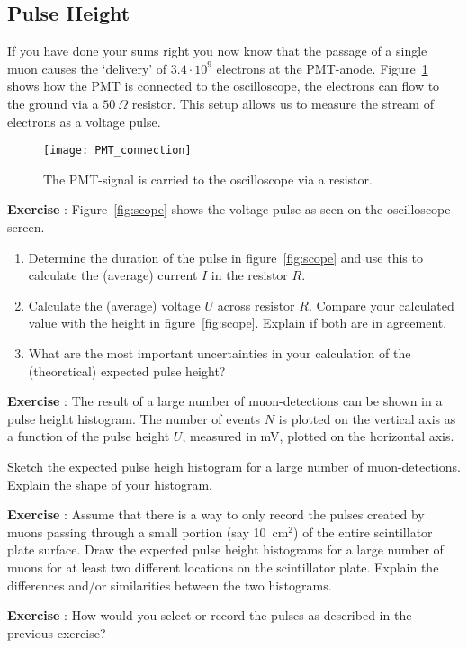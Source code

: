 \subsection{Pulse Height}
If you have done your sums right you now know that the passage of a single muon causes the `delivery' of $3.4 \cdot 10^9$ electrons at the PMT-anode. Figure~\ref{fig:PMT_connection} shows how the PMT is connected to the oscilloscope, the electrons can flow to the ground via a $50~\Omega$ resistor. This setup allows us to measure the stream of electrons as a voltage pulse.

\begin{figure}\begin{center}
\texttt{[image: PMT\_connection]}%
\caption{The PMT-signal is carried to the oscilloscope via a resistor. }\label{fig:PMT_connection}
\end{center}\end{figure}

\begin{shaded}
\textbf{Exercise \theExercise {}} : Figure~\ref{fig:scope} shows the voltage pulse as seen on the oscilloscope screen.
\begin{enumerate}[-]
\item Determine the duration of the pulse in figure~\ref{fig:scope} and use this to calculate the (average) current $I$ in the resistor $R$.
\item Calculate the (average) voltage $U$ across resistor $R$. Compare your calculated value with the height in figure~\ref{fig:scope}. Explain if both are in agreement.
\item What are the most important uncertainties in your calculation of the (theoretical) expected pulse height?
\end{enumerate}
\end{shaded}

\begin{shaded}
\textbf{Exercise \theExercise {}} : The result of a large number of muon-detections can be shown in a pulse height histogram. The number of events $N$ is plotted on the vertical axis as a function of the pulse height $U$, measured in mV, plotted on the horizontal axis.

Sketch the expected pulse heigh histogram for a large number of muon-detections. Explain the shape of your histogram.
\end{shaded}

\begin{shaded}
\textbf{Exercise \theExercise {}} : Assume that there is a way to only record the pulses created by muons passing through a small portion (say 10~cm$^2$) of the entire scintillator plate surface. Draw the expected pulse height histograms for a large number of muons for at least two different locations on the scintillator plate. Explain the differences and/or similarities between the two histograms.\end{shaded}

\begin{shaded}
\textbf{Exercise \theExercise {}} : How would you select or record the pulses as described in the previous exercise?\end{shaded}



